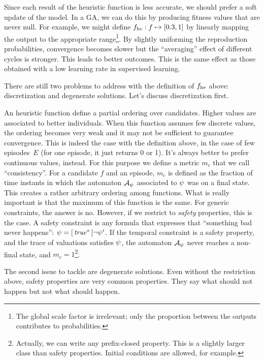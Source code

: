 Since each result of the heuristic function is less accurate, we should prefer
a soft update of the model. In a GA, we can do this by producing fitness
values that are never null. For example, we might define $f_{\text{he}}: f
\mapsto [0.3, 1]$ by linearly mapping the output to the appropriate
range\footnote{The global scale factor is irrelevant; only the proportion
between the outputs contributes to probabilities.}. By slightly uniforming the
reproduction probabilities, convergence becomes slower but the ``averaging''
effect of different cycles is stronger. This leads to better outcomes. This is
the same effect as those obtained with a low learning rate in supervised
learning.

There are still two problems to address with the definition of $f_{\text{he}}$
above: discretization and degenerate solutions. Let's discuss discretization
first.

An heuristic function define a partial ordering over candidates. Higher values
are associated to better individuals.  When this function assumes few discrete
values, the ordering becomes very weak and it may not be sufficient to
guarantee convergence. This is indeed the case with the definition above, in
the case of few episodes~$E$ (for one episode, it just returns 0 or 1). It's
always better to prefer continuous values, instead. For this purpose we
define a metric $m_c$ that we call ``consistency''. For a candidate $f$ and an
episode, $m_c$ is defined as the fraction of time instants in which the
automaton $\mathcal{A}_\psi$ associated to $\psi$ was on a final
state. This creates a rather arbitrary ordering among functions. What is
really important is that the maximum of this function is the same. For generic
constraints, the answer is no. However, if we restrict to \emph{safety}
properties, this is the case. A safety constraint is any formula that
expresses that ``something bad never happens'': $\psi =
[\, {\text{\textit{true}}^*} \,]\neg\psi'$. If the temporal constraint is a safety
property, and the trace of valuations satisfies $\psi$, the automaton
$\mathcal{A}_\psi$ never reaches a non-final state, and $m_c =
1$\footnote{Actually, we can write any prefix-closed property. This is a
slightly larger class than safety properties. Initial conditions are allowed,
for example.}.

The second issue to tackle are degenerate solutions. Even without the
restriction above, safety properties are very common properties. They say what
should not happen but not what should happen.

